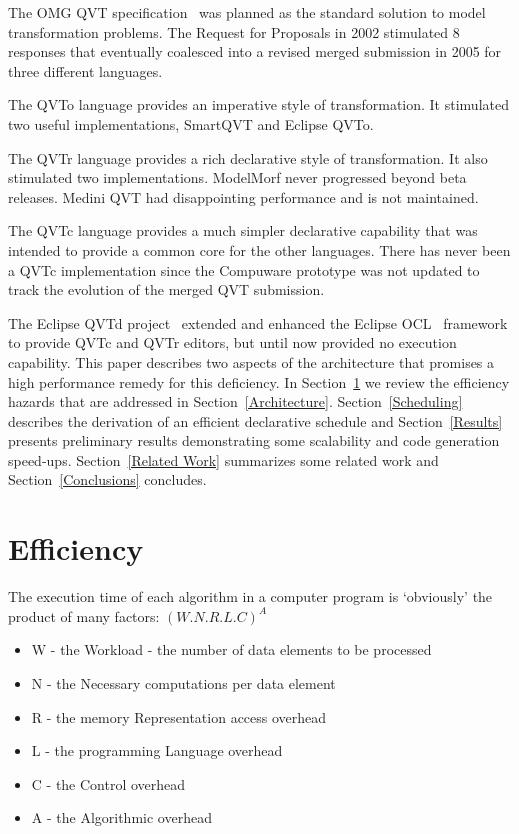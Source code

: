 \documentclass{llncs}
\begin{document}
The OMG QVT specification~\cite{QVT-1.3-Beta} was planned as the standard solution to model transformation problems. The Request for Proposals in 2002 stimulated 8 responses that eventually coalesced into a revised merged submission in 2005 for three different languages.

The QVTo language provides an imperative style of transformation. It stimulated two useful implementations, SmartQVT and Eclipse QVTo. %

The QVTr language provides a rich declarative style of transformation. It also stimulated two implementations. ModelMorf never progressed beyond beta releases. 
Medini QVT had disappointing performance and is not maintained.

The QVTc language provides a much simpler declarative capability that was intended to provide a common core for the other languages. There has never been a QVTc implementation since the Compuware prototype was not updated to track the evolution of the merged QVT submission.

The Eclipse QVTd project~\cite{Eclipse-QVTd} extended and enhanced the Eclipse OCL~\cite{Eclipse-OCL} framework to provide QVTc and QVTr editors, but until now provided no execution capability. This paper describes two aspects of the architecture that promises a high performance remedy for this deficiency. In Section~\ref{Efficiency} we review the efficiency hazards that are addressed in Section~\ref{Architecture}. Section~\ref{Scheduling} describes the derivation of an efficient declarative schedule and Section~\ref{Results} presents preliminary results demonstrating some scalability and code generation speed-ups. Section~\ref{Related Work} summarizes some related work and Section~\ref{Conclusions} concludes.

\section{Efficiency}\label{Efficiency}

The execution time of each algorithm in a computer program is `obviously' the product of many factors: \((W.N.R.L.C)^A\)
\begin{itemize}
\item W - the Workload - the number of data elements to be processed
\item N - the Necessary computations per data element
\item R - the memory Representation access overhead
\item L - the programming Language overhead
\item C - the Control overhead
\item A - the Algorithmic overhead
\end{itemize}
\end{document}
